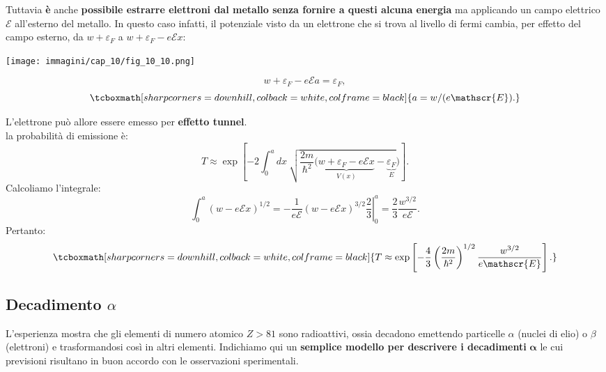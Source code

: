 Tuttavia \textbf{è} anche \textbf{possibile estrarre elettroni dal metallo senza fornire a questi alcuna energia} ma applicando un campo elettrico $\mathscr{E}$ all'esterno del metallo. In questo caso infatti, il potenziale visto da un elettrone che si trova al livello di fermi cambia, per effetto del campo esterno, da $w+\varepsilon _F$ a $w+\varepsilon _F-e\mathscr{E}x$:\\
\vspace{.5cm}
\begin{minipage}{.6\textwidth}
\texttt{[image: immagini/cap\_10/fig\_10\_10.png]}
\end{minipage}
\begin{minipage}{.4\textwidth}
\begin{equation}
w+\varepsilon _F-e\mathscr{E}a=\varepsilon _F ,
\end{equation}
\begin{equation}
\tcboxmath[sharp corners=downhill, colback=white, colframe=black]{
a= w/(e\mathscr{E}) .
}
\end{equation}
\end{minipage}
L'elettrone può allore essere emesso per \textbf{effetto tunnel}.\\
la probabilità di emissione è:
	\begin{equation}
		T \approx \exp \left[-2 \int_{0} ^{a} dx\ \sqrt{\frac{2m}{\hbar ^2} (\underbrace{w+\varepsilon _F-e\mathscr{E}x}_{V(x)}-\underbrace{\varepsilon _F}_{E}})\right].
	\end{equation}
Calcoliamo l'integrale:
	\begin{equation}
		\int _{0} ^{a} \left( w-e\mathscr{E}x \right) ^{1/2}= \left. -\frac{1}{e\mathscr{E}}\left( w-e\mathscr{E}x \right) ^{3/2}\frac{2}{3}\right| _0 ^a =\frac{2}{3}\frac{w^{3/2}}{e\mathscr{E}}.
	\end{equation}
Pertanto:
	\begin{equation}
		\tcboxmath[sharp corners=downhill, colback=white, colframe=black]{
		T \approx \exp \left[-\frac{4}{3}\left(\frac{2m}{\hbar ^2}\right)^{1/2}\frac{w^{3/2}}{e\mathscr{E}}\right].
		}
	\end{equation}
\subsection{Decadimento $\alpha$}
L'esperienza mostra che gli elementi di numero atomico $Z>81$ sono radioattivi, ossia decadono emettendo particelle $\alpha$ (nuclei di elio) o $\beta$ (elettroni) e trasformandosi così in altri elementi. Indichiamo qui un \textbf{semplice modello per descrivere i decadimenti} $\mathbf{\alpha}$ le cui previsioni risultano in buon accordo con le osservazioni sperimentali.\\

